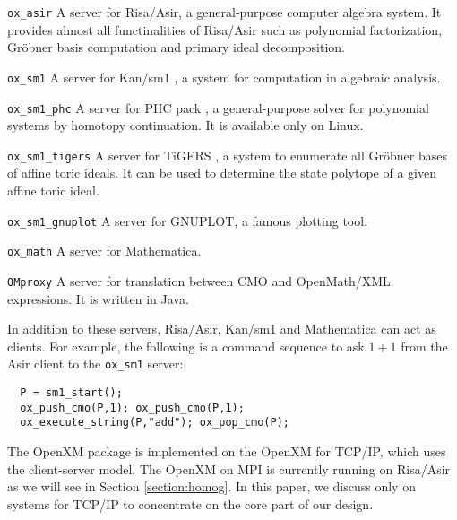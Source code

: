 \begin{description}
\item{\tt ox\_asir}
A server for Risa/Asir, a general-purpose computer algebra
system. It provides almost
all functinalities of Risa/Asir such as polynomial factorization,
Gr\"obner basis computation and primary ideal decomposition.
\item{\tt ox\_sm1}
A server for Kan/sm1 \cite{kan}, a system for computation in algebraic
analysis. 
\item {\tt ox\_sm1\_phc}
A server for PHC pack \cite{phc}, a general-purpose solver for
polynomial systems by homotopy continuation. It is available only
on Linux.
\item {\tt ox\_sm1\_tigers}
A server for TiGERS \cite{tigers}, a system to enumerate
all Gr\"obner bases of affine toric ideals.
It can be used to determine the state polytope
of a given affine toric ideal.
\item {\tt ox\_sm1\_gnuplot}
A server for GNUPLOT, a famous plotting tool.
\item {\tt ox\_math}
A server for Mathematica.
\item {\tt OMproxy}
A server for translation between CMO and OpenMath/XML expressions.
It is written in Java.
\end{description}
In addition to these servers, Risa/Asir, Kan/sm1 and Mathematica
can act as clients. 
For example, the following is a command sequence to ask $1+1$ from
the Asir client to the {\tt ox\_sm1} server:
\begin{verbatim}
  P = sm1_start();
  ox_push_cmo(P,1); ox_push_cmo(P,1);
  ox_execute_string(P,"add"); ox_pop_cmo(P);
\end{verbatim}
The OpenXM package is implemented on the  OpenXM for TCP/IP, 
which uses the client-server model.
The OpenXM on MPI \cite{MPI} is currently running on Risa/Asir
as we will see in Section \ref{section:homog}.
In this paper, we discuss only on systems for TCP/IP
to concentrate on the core part of our design.






